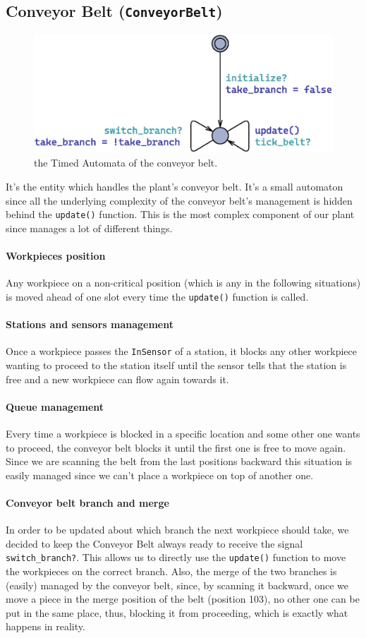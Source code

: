 \documentclass[a4paper]{article}
\begin{document}
    \subsection{Conveyor Belt (\texttt{ConveyorBelt})}

    \begin{figure}[h!]
        \centering
        \includegraphics[width=0.33\columnwidth]{./images/automata/conveyor_belt}
        \caption{the Timed Automata of the conveyor belt.}
    \end{figure}

    It's the entity which handles the plant's conveyor belt. It's a small automaton since all the underlying complexity of the conveyor belt's management is hidden behind the \texttt{update()} function. This is the most complex component of our plant since manages a lot of different things.

    \paragraph{Workpieces position} Any workpiece on a non-critical position (which is any in the following situations) is moved ahead of one slot every time the \texttt{update()} function is called.

    \paragraph{Stations and sensors management} Once a workpiece passes the \texttt{InSensor} of a station, it blocks any other workpiece wanting to proceed to the station itself until the sensor tells that the station is free and a new workpiece can flow again towards it.

    \paragraph{Queue management} Every time a workpiece is blocked in a specific location and some other one wants to proceed, the conveyor belt blocks it until the first one is free to move again. Since we are scanning the belt from the last positions backward this situation is easily managed since we can't place a workpiece on top of another one.

    \paragraph{Conveyor belt branch and merge} In order to be updated about which branch the next workpiece should take, we decided to keep the Conveyor Belt always ready to receive the signal \texttt{switch\_branch?}. This allows us to directly use the \texttt{update()} function to move the workpieces on the correct branch. Also, the merge of the two branches is (easily) managed by the conveyor belt, since, by scanning it backward, once we move a piece in the merge position of the belt (position 103), no other one can be put in the same place, thus, blocking it from proceeding, which is exactly what happens in reality.
\end{document}
